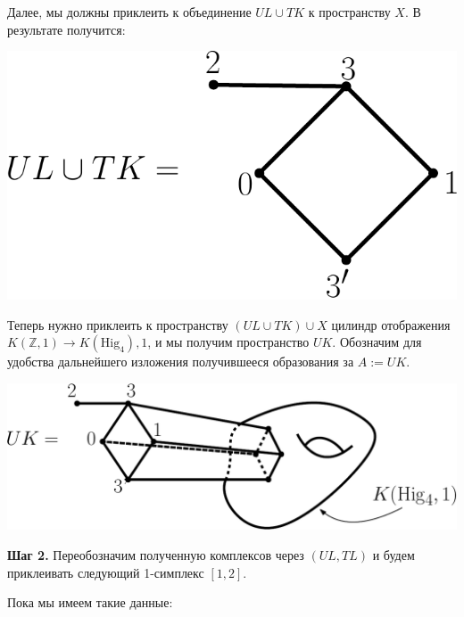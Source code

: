 \documentclass[14pt, dvipsnames]{extarticle}
\theoremstyle{definition}
\theoremstyle{remark}
\begin{document}
Далее, мы должны приклеить к объединение $UL\cup TK$ к пространству $X$. В результате получится: 


\begin{center}
\includegraphics[scale=0.5]{pict3}
\end{center}


Теперь нужно приклеить к пространству $(UL\cup TK)\cup X$ цилиндр отображения $K(\mathbb{Z}, 1)\to K(\mathrm{Hig}_4), 1$, и мы получим пространство $UK$. Обозначим для удобства дальнейшего изложения получившееся образования за $A:=UK$. 


\begin{center}
\includegraphics[scale=0.5]{pict4}
\end{center}





{\bf Шаг 2.} Переобозначим полученную комплексов через $(UL, TL)$ и будем приклеивать следующий 1-симплекс $[1, 2]$.

Пока мы имеем такие данные:   
\end{document}

